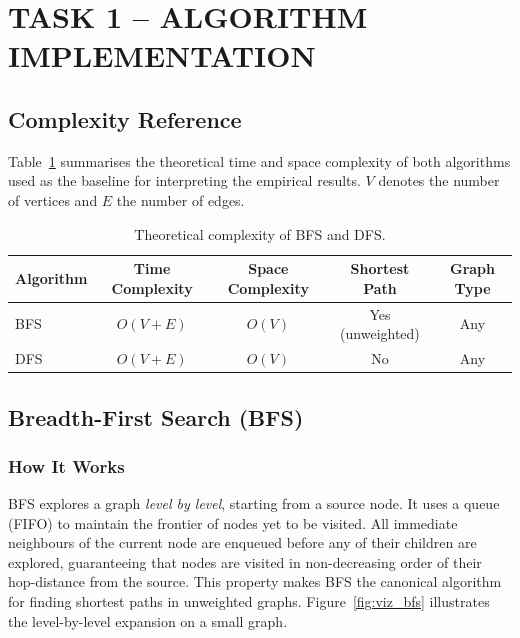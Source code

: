 \documentclass[12pt,a4paper]{article}
\begin{document}
	\section{TASK 1 -- ALGORITHM IMPLEMENTATION}
	
	\subsection{Complexity Reference}
	
	Table~\ref{tab:complexity} summarises the theoretical time and space complexity
	of both algorithms used as the baseline for interpreting the empirical results.
	$V$ denotes the number of vertices and $E$ the number of edges.
	
	\begin{table}[h!]
		\centering
		\caption{Theoretical complexity of BFS and DFS.}
		\label{tab:complexity}
		\renewcommand{\arraystretch}{1.3}
		\begin{tabular}{lcccc}
			\toprule
			\textbf{Algorithm} & \textbf{Time Complexity} & \textbf{Space Complexity} & \textbf{Shortest Path} & \textbf{Graph Type} \\
			\midrule
			BFS & $O(V + E)$ & $O(V)$ & Yes (unweighted) & Any \\
			DFS & $O(V + E)$ & $O(V)$ & No               & Any \\
			\bottomrule
		\end{tabular}
	\end{table}
	
	\subsection{Breadth-First Search (BFS)}
	
	\subsubsection{How It Works}
	
	BFS explores a graph \emph{level by level}, starting from a source node. It uses
	a queue (FIFO) to maintain the frontier of nodes yet to be visited. All immediate
	neighbours of the current node are enqueued before any of their children are
	explored, guaranteeing that nodes are visited in non-decreasing order of their
	hop-distance from the source. This property makes BFS the canonical algorithm for
	finding shortest paths in unweighted graphs.
	Figure~\ref{fig:viz_bfs} illustrates the level-by-level expansion on a small graph.
	
\end{document}
